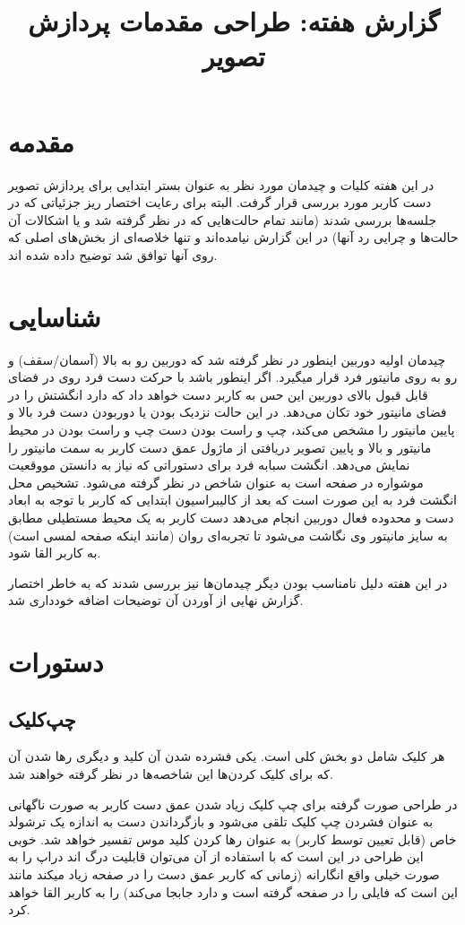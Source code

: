 \documentclass{article}
\title{گزارش هفته: طراحی مقدمات پردازش تصویر}
\begin{document}
\heading
\header
\allowdisplaybreaks
\tableofcontents
\pagebreak

\section{مقدمه}
در این هفته کلیات و چیدمان مورد نظر به عنوان بستر ابتدایی برای پردازش تصویر دست کاربر مورد بررسی قرار گرفت. البته برای رعایت اختصار ریز جزئیاتی که در جلسه‌ها بررسی شدند (مانند تمام حالت‌هایی که در نظر گرفته شد و یا اشکالات آن حالت‌ها و چرایی رد آنها) در این گزارش نیامده‌اند و تنها خلاصه‌ای از بخش‌های اصلی که روی آنها توافق شد توضیح داده شده اند.

\section{شناسایی}
چیدمان اولیه دوربین اینطور در نظر گرفته شد که دوربین رو به بالا (آسمان/سقف) و رو به روی مانیتور فرد قرار میگیرد. اگر اینطور باشد با حرکت دست فرد روی در فضای قابل قبول بالای دوربین این حس به کاربر دست خواهد داد که دارد انگشتش را در فضای مانیتور خود تکان می‌دهد.
در این حالت نزدیک بودن یا دوربودن دست فرد بالا و پایین مانیتور را مشخص می‌کند، چپ و راست بودن دست چپ و راست بودن در محیط مانیتور و بالا و پایین تصویر دریافتی از ماژول عمق دست کاربر به سمت مانیتور را نمایش می‌دهد.
انگشت سبابه فرد برای دستوراتی که نیاز به دانستن مووقعیت موشواره در صفحه است به عنوان شاخص در نظر گرفته می‌شود.
تشخیص محل انگشت فرد به این صورت است که بعد از کالیبراسیون ابتدایی که کاربر با توجه به ابعاد دست و محدوده فعال دوربین انجام می‌دهد دست کاربر به یک محیط مستطیلی مطابق به سایز مانیتور وی نگاشت می‌شود تا تجربه‌ای روان (مانند اینکه صفحه لمسی است) به  کاربر القا شود.


در این هفته دلیل نامناسب بودن دیگر چیدمان‌ها نیز بررسی شدند که به خاطر اختصار گزارش نهایی از آوردن آن توضیحات اضافه خودداری شد. 

\section{دستورات}
\subsection{چپ‌کلیک}
 هر کلیک شامل دو بخش کلی است. یکی فشرده شدن آن کلید و دیگری رها شدن آن که برای کلیک کردن‌ها این شاخصه‌ها در نظر گرفته خواهند شد.
 
 در طراحی صورت گرفته برای چپ کلیک زیاد شدن عمق دست کاربر به صورت ناگهانی به عنوان فشردن چپ کلیک تلقی می‌شود و بازگرداندن دست به اندازه یک ترشولد خاص (قابل تعیین توسط کاربر) به عنوان رها کردن کلید موس تفسیر خواهد شد. خوبی این طراحی در این است که با استفاده از آن می‌توان قابلیت درگ اند دراپ را به صورت خیلی واقع انگارانه (زمانی که کاربر عمق دست را در صفحه زیاد میکند مانند این است که فایلی را در صفحه گرفته است و دارد جابجا می‌کند) را به کاربر القا خواهد کرد.
 
\end{document}
